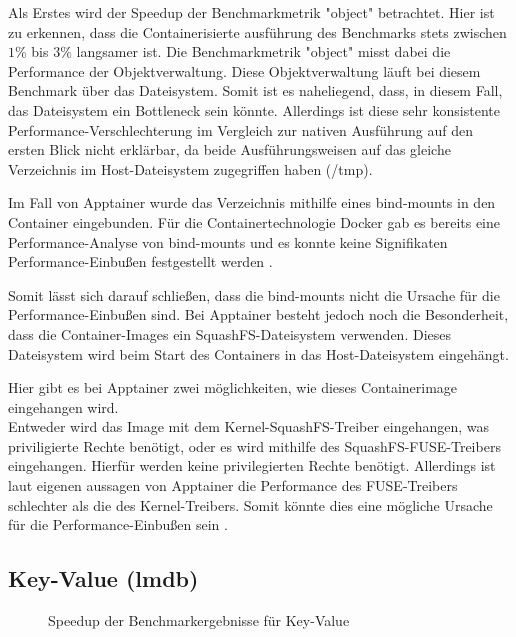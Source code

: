 Als Erstes wird der Speedup der Benchmarkmetrik "object" betrachtet. Hier ist zu erkennen, dass die Containerisierte ausführung des Benchmarks stets zwischen $1\%$ bis $3\%$ langsamer ist. Die Benchmarkmetrik "object" misst dabei die Performance der Objektverwaltung. Diese Objektverwaltung läuft bei diesem Benchmark über das Dateisystem. Somit ist es naheliegend, dass, in diesem Fall, das Dateisystem ein Bottleneck sein könnte. Allerdings ist diese sehr konsistente Performance-Verschlechterung im Vergleich zur nativen Ausführung auf den ersten Blick nicht erklärbar, da beide Ausführungsweisen auf das gleiche Verzeichnis im Host-Dateisystem zugegriffen haben (/tmp). 

Im Fall von Apptainer wurde das Verzeichnis mithilfe eines bind-mounts in den Container eingebunden. Für die Containertechnologie Docker gab es bereits eine Performance-Analyse von bind-mounts und es konnte keine Signifikaten Performance-Einbußen festgestellt werden \cite[Vgl. 4]{dordevicFileSystemPerformance2022}. 

Somit lässt sich darauf schließen, dass die bind-mounts nicht die Ursache für die Performance-Einbußen sind. Bei Apptainer besteht jedoch noch die Besonderheit, dass die Container-Images ein SquashFS-Dateisystem verwenden. Dieses Dateisystem wird beim Start des Containers in das Host-Dateisystem eingehängt. 

Hier gibt es bei Apptainer zwei möglichkeiten, wie dieses Containerimage eingehangen wird. \\
Entweder wird das Image mit dem Kernel-SquashFS-Treiber eingehangen, was priviligierte Rechte benötigt, oder es wird mithilfe des SquashFS-FUSE-Treibers eingehangen. Hierfür werden keine privilegierten Rechte benötigt. Allerdings ist laut eigenen aussagen von Apptainer die Performance des FUSE-Treibers schlechter als die des Kernel-Treibers. Somit könnte dies eine mögliche Ursache für die Performance-Einbußen sein \cite{apptainerSecurityApptainerApptainer}.  

\subsection{Key-Value (lmdb)}

\begin{figure}[H]
    \centering
    
    \caption{Speedup der Benchmarkergebnisse für Key-Value}
    \label{fig:speedup_kv}
\end{figure}

